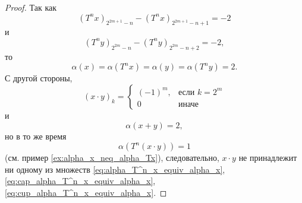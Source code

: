 \begin{proof}
	Так как
	\begin{equation}
		(T^n x)_{2^{2m+1}-n} - (T^n x)_{2^{2m+1}-n+1} = -2
	\end{equation}
	и
	\begin{equation}
		(T^n y)_{2^{2m}-n} - (T^n y)_{2^{2m}-n+2} = -2
		,
	\end{equation}
	то
	\begin{equation}
		\alpha(x) = \alpha(T^n x) = \alpha(y) = \alpha(T^n y) = 2
		.
	\end{equation}
	С другой стороны,
	\begin{equation}
		(x\cdot y)_k = \begin{cases}
			(-1)^m,  & \mbox{если } k = 2^m     \\
			0        & \mbox{иначе }
		\end{cases}
	\end{equation}
	и
	\begin{equation}
		\alpha(x+y) = 2
		,
	\end{equation}
	но в то же время
	\begin{equation}
		\alpha(T^n(x \cdot y)) = 1
	\end{equation}
	(см. пример \ref{ex:alpha_x_neq_alpha_Tx}),
	следовательно, $x \cdot y$ не принадлежит ни одному из множеств
	\eqref{eq:alpha_T^n_x_equiv_alpha_x}, \eqref{eq:cap_alpha_T^n_x_equiv_alpha_x}, \eqref{eq:cup_alpha_T^n_x_equiv_alpha_x}.

\end{proof}
